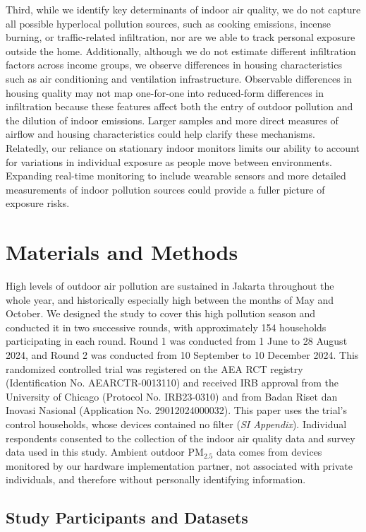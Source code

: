 \documentclass[9pt,twocolumn,twoside]{pnas-new}
\begin{document}
Third, while we identify key determinants of indoor air quality, we do not capture all possible hyperlocal pollution sources, such as cooking emissions, incense burning, or traffic-related infiltration, nor are we able to track personal exposure outside the home. 
Additionally, although we do not estimate different infiltration factors across income groups, we observe differences in housing characteristics such as air conditioning and ventilation infrastructure. Observable differences in housing quality may not map one-for-one into reduced-form differences in infiltration because these features affect both the entry of outdoor pollution and the dilution of indoor emissions. Larger samples and more direct measures of airflow and housing characteristics could help clarify these mechanisms.
Relatedly, our reliance on stationary indoor monitors limits our ability to account for variations in individual exposure as people move between environments. Expanding real-time monitoring to include wearable sensors and more detailed measurements of indoor pollution sources could provide a fuller picture of exposure risks.


\section{Materials and Methods} \label{sec:methods}
High levels of outdoor air pollution are sustained in Jakarta throughout the whole year, and historically especially high between the months of May and October. We designed the study to cover this high pollution season and conducted it in two successive rounds, with approximately 154 households participating in each round. Round 1 was conducted from 1 June to 28 August 2024, and Round 2 was conducted from 10 September to 10 December 2024. This randomized controlled trial was registered on the AEA RCT registry (Identification No. AEARCTR-0013110) and received IRB approval from the University of Chicago (Protocol No. IRB23-0310) and from Badan Riset dan Inovasi Nasional (Application No. 29012024000032). This paper uses the trial's control households, whose devices contained no filter (\textit{SI Appendix}).
Individual respondents consented to the collection of the indoor air quality data and survey data used in this study. Ambient outdoor PM$_{2.5}$ data comes from devices monitored by our hardware implementation partner, not associated with private individuals, and therefore without personally identifying information.


\subsection{Study Participants and Datasets}
\label{ssec:methods_sampling}
\end{document}
